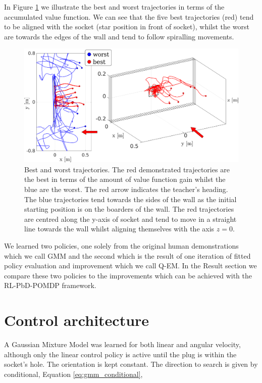 In Figure \ref{fig:best_worst_traj} we illustrate the best and worst trajectories in terms of the accumulated value function.
We can see that the five best trajectories (red) tend to be aligned with the socket (star position in front of socket), 
whilst the worst are towards the edges of the wall and tend to follow spiralling movements. 

\begin{figure}
 \centering
 \includegraphics[width=\textwidth]{./ch4-PiH/Figures/ValueFunction/value_func_final_v3.pdf}
 \caption{Best and worst trajectories. The red demonstrated trajectories are the best in terms of the amount of value function 
 gain whilst the blue are the worst. The red arrow indicates the teacher's heading. The blue trajectories tend 
 towards the sides of the wall as the initial starting position is on the boarders of the wall. The red trajectories are centred along the y-axis of socket and tend to move in a straight line towards 
 the wall whilst aligning themselves with the axis $z=0$.} 
 \label{fig:best_worst_traj}
\end{figure}

We learned two policies, one solely from the original human demonstrations which we call GMM and the second which 
is the result of one iteration of fitted policy evaluation and improvement which we call Q-EM. In the Result section
we compare these two policies to the improvements which can be achieved with the RL-PbD-POMDP framework.

\section{Control architecture}\label{ch4:control_architecture}

A Gaussian Mixture Model was learned for both linear and angular velocity,
although only the linear control policy is active until the plug is within 
the socket's hole. The orientation is kept constant.
The direction to search is given by conditional, Equation \ref{eq:gmm_conditional},

